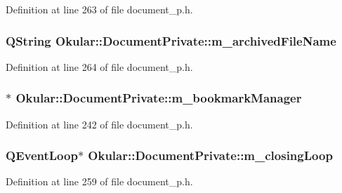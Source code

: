 Definition at line 263 of file document\+\_\+p.\+h.

\hypertarget{classOkular_1_1DocumentPrivate_ac47be11934cb0cb3e7d8876e3e4653af}{
\subsubsection[{m\+\_\+archived\+File\+Name}]{\setlength{\rightskip}{0pt plus 5cm}Q\+String Okular\+::\+Document\+Private\+::m\+\_\+archived\+File\+Name}}\label{classOkular_1_1DocumentPrivate_ac47be11934cb0cb3e7d8876e3e4653af}


Definition at line 264 of file document\+\_\+p.\+h.

\hypertarget{classOkular_1_1DocumentPrivate_a098282fb7e82c81ea9402333864fd389}{
\subsubsection[{m\+\_\+bookmark\+Manager}]{$\ast$ Okular\+::\+Document\+Private\+::m\+\_\+bookmark\+Manager}}\label{classOkular_1_1DocumentPrivate_a098282fb7e82c81ea9402333864fd389}


Definition at line 242 of file document\+\_\+p.\+h.

\hypertarget{classOkular_1_1DocumentPrivate_a836cb1b614d8d25bad8403dfd746ef00}{
\subsubsection[{m\+\_\+closing\+Loop}]{\setlength{\rightskip}{0pt plus 5cm}Q\+Event\+Loop$\ast$ Okular\+::\+Document\+Private\+::m\+\_\+closing\+Loop}}\label{classOkular_1_1DocumentPrivate_a836cb1b614d8d25bad8403dfd746ef00}


Definition at line 259 of file document\+\_\+p.\+h.

